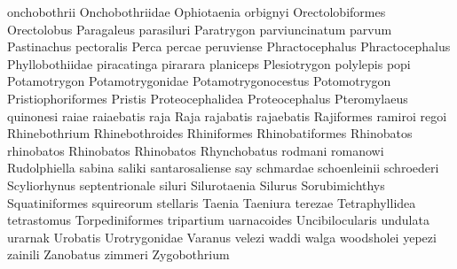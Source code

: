 {onchobothrii
Onchobothriidae
Ophiotaenia
orbignyi
Orectolobiformes
Orectolobus
Paragaleus
parasiluri
Paratrygon
parviuncinatum
parvum
Pastinachus
pectoralis
Perca
percae
peruviense
Phractocephalus
Phractocephalus
Phyllobothiidae
piracatinga
pirarara
planiceps
Plesiotrygon
polylepis
popi
Potamotrygon
Potamotrygonidae
Potamotrygonocestus
Potomotrygon
Pristiophoriformes
Pristis
Proteocephalidea
Proteocephalus
Pteromylaeus
quinonesi
raiae
raiaebatis
raja
Raja
rajabatis
rajaebatis
Rajiformes
ramiroi
regoi
Rhinebothrium
Rhinebothroides
Rhiniformes
Rhinobatiformes
Rhinobatos
rhinobatos
Rhinobatos
Rhinobatos
Rhynchobatus
rodmani
romanowi
Rudolphiella
sabina
saliki
santarosaliense
say
schmardae
schoenleinii
schroederi
Scyliorhynus
septentrionale
siluri
Silurotaenia
Silurus
Sorubimichthys
Squatiniformes
squireorum
stellaris
Taenia
Taeniura
terezae
Tetraphyllidea
tetrastomus
Torpediniformes
tripartium
uarnacoides
Uncibilocularis
undulata
urarnak
Urobatis
Urotrygonidae
Varanus
velezi
waddi
walga
woodsholei
yepezi
zainili
Zanobatus
zimmeri
Zygobothrium
}
